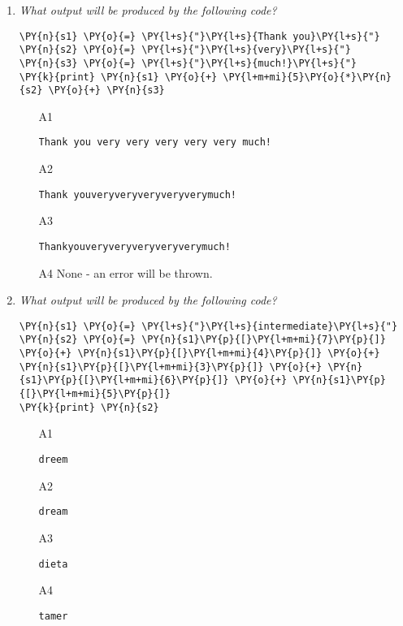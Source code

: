 \begin{enumerate}
\vspace{6mm}
\item {\em What output will be produced by the following code?}\\

\begin{Verbatim}[commandchars=\\\{\}]
\PY{n}{s1} \PY{o}{=} \PY{l+s}{"}\PY{l+s}{Thank you}\PY{l+s}{"}
\PY{n}{s2} \PY{o}{=} \PY{l+s}{"}\PY{l+s}{very}\PY{l+s}{"}
\PY{n}{s3} \PY{o}{=} \PY{l+s}{"}\PY{l+s}{much!}\PY{l+s}{"}
\PY{k}{print} \PY{n}{s1} \PY{o}{+} \PY{l+m+mi}{5}\PY{o}{*}\PY{n}{s2} \PY{o}{+} \PY{n}{s3}
\end{Verbatim}
\vspace{6mm}

\begin{enumerate}
\item[A1] 
\begin{verbatim}
Thank you very very very very very much!
\end{verbatim}
\item[A2] 
\begin{verbatim}
Thank youveryveryveryveryverymuch!
\end{verbatim}
\item[A3] 
\begin{verbatim}
Thankyouveryveryveryveryverymuch!
\end{verbatim}
\item[A4] None - an error will be thrown.
\end{enumerate}

\vspace{6mm}

\item {\em What output will be produced by the following code?}\\

\begin{Verbatim}[commandchars=\\\{\}]
\PY{n}{s1} \PY{o}{=} \PY{l+s}{"}\PY{l+s}{intermediate}\PY{l+s}{"}
\PY{n}{s2} \PY{o}{=} \PY{n}{s1}\PY{p}{[}\PY{l+m+mi}{7}\PY{p}{]} \PY{o}{+} \PY{n}{s1}\PY{p}{[}\PY{l+m+mi}{4}\PY{p}{]} \PY{o}{+} \PY{n}{s1}\PY{p}{[}\PY{l+m+mi}{3}\PY{p}{]} \PY{o}{+} \PY{n}{s1}\PY{p}{[}\PY{l+m+mi}{6}\PY{p}{]} \PY{o}{+} \PY{n}{s1}\PY{p}{[}\PY{l+m+mi}{5}\PY{p}{]}
\PY{k}{print} \PY{n}{s2}
\end{Verbatim}
\vspace{6mm}

\begin{enumerate}
\item[A1] 
\begin{verbatim}
dreem
\end{verbatim}
\item[A2] 
\begin{verbatim}
dream
\end{verbatim}
\item[A3] 
\begin{verbatim}
dieta
\end{verbatim}
\item[A4] 
\begin{verbatim}
tamer
\end{verbatim}
\end{enumerate}


\end{enumerate}
